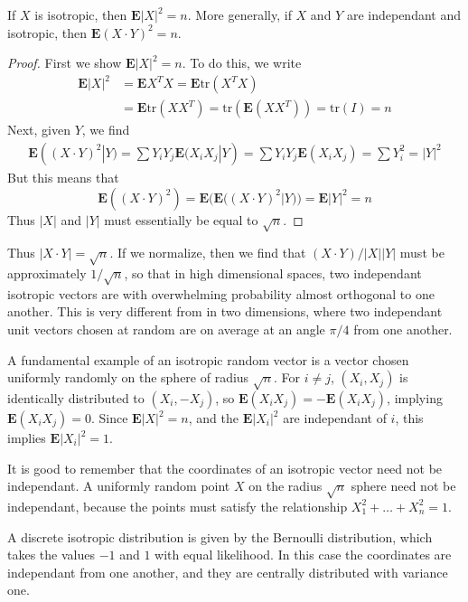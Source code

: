 \begin{lemma}
    If $X$ is isotropic, then $\mathbf{E} |X|^2 = n$. More generally, if $X$ and $Y$ are independant and isotropic, then $\mathbf{E}(X \cdot Y)^2 = n$.
\end{lemma}
\begin{proof}
    First we show $\mathbf{E} |X|^2 = n$. To do this, we write
    \begin{align*}
        \mathbf{E} |X|^2 &= \mathbf{E} X^T X = \mathbf{E} \text{tr}(X^T X)\\
        &= \mathbf{E} \text{tr}(XX^T) = \text{tr}(\mathbf{E}(XX^T)) = \text{tr}(I) = n
    \end{align*}
    Next, given $Y$, we find
    \begin{align*}
        \mathbf{E}((X \cdot Y)^2 | Y) = \sum Y_iY_j \mathbf{E}(X_iX_j|Y) = \sum Y_iY_j \mathbf{E}(X_iX_j) = \sum Y_i^2 = |Y|^2
    \end{align*}
    But this means that
    \[ \mathbf{E}((X \cdot Y)^2) = \mathbf{E}(\mathbf{E}((X \cdot Y)^2 | Y)) = \mathbf{E} |Y|^2 = n \]
    Thus $|X|$ and $|Y|$ must essentially be equal to $\sqrt{n}$.
\end{proof}

Thus $|X \cdot Y| = \sqrt{n}$. If we normalize, then we find that $(X \cdot Y)/|X||Y|$ must be approximately $1/\sqrt{n}$, so that in high dimensional spaces, two independant isotropic vectors are with overwhelming probability almost orthogonal to one another. This is very different from in two dimensions, where two independant unit vectors chosen at random are on average at an angle $\pi/4$ from one another.

\begin{example}
    A fundamental example of an isotropic random vector is a vector chosen uniformly randomly on the sphere of radius $\sqrt{n}$. For $i \neq j$, $(X_i,X_j)$ is identically distributed to $(X_i,-X_j)$, so $\mathbf{E}(X_iX_j) = - \mathbf{E}(X_iX_j)$, implying $\mathbf{E}(X_iX_j) = 0$. Since $\mathbf{E} |X|^2 = n$, and the $\mathbf{E} |X_i|^2$ are independant of $i$, this implies $\mathbf{E} |X_i|^2 = 1$.
\end{example}

It is good to remember that the coordinates of an isotropic vector need not be independant. A uniformly random point $X$ on the radius $\sqrt{n}$ sphere need not be independant, because the points must satisfy the relationship $X_1^2 + \dots + X_n^2 = 1$.

\begin{example}
    A discrete isotropic distribution is given by the Bernoulli distribution, which takes the values $-1$ and $1$ with equal likelihood. In this case the coordinates are independant from one another, and they are centrally distributed with variance one.
\end{example}

